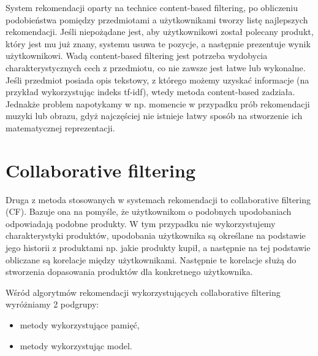 System rekomendacji oparty na technice content-based filtering, po obliczeniu podobieństwa pomiędzy przedmiotami a użytkownikami tworzy listę najlepszych rekomendacji. Jeśli niepożądane jest, aby użytkownikowi został polecany produkt, który jest mu już znany, systemu usuwa te pozycje, a następnie prezentuje wynik użytkownikowi. Wadą content-based filtering jest potrzeba wydobycia charakterystycznych cech z przedmiotu, co nie zawsze jest łatwe lub wykonalne. Jeśli przedmiot posiada opis tekstowy, z którego możemy uzyskać informacje
(na przykład wykorzystując indeks tf-idf), wtedy metoda content-based zadziała. Jednakże problem napotykamy w np. momencie w przypadku prób rekomendacji muzyki lub obrazu, gdyż najczęściej nie istnieje łatwy sposób na stworzenie ich matematycznej reprezentacji.

\section{Collaborative filtering}

Druga z metoda stosowanych w systemach rekomendacji to collaborative filtering (CF).
Bazuje ona na pomyśle, że użytkownikom o podobnych upodobaniach odpowiadają podobne produkty. W tym przypadku nie wykorzystujemy charakterystyki produktów, upodobania użytkownika są określane na podstawie jego historii z produktami np. jakie produkty kupił, a następnie na tej podstawie obliczane są korelacje między użytkownikami. Następnie te korelacje służą do stworzenia dopasowania produktów dla konkretnego użytkownika.

Wśród algorytmów rekomendacji wykorzystujących collaborative filtering wyróżniamy 2 podgrupy:
\begin{itemize}
    \item metody wykorzystujące pamięć,
    \item metody wykorzystując model.
\end{itemize}

